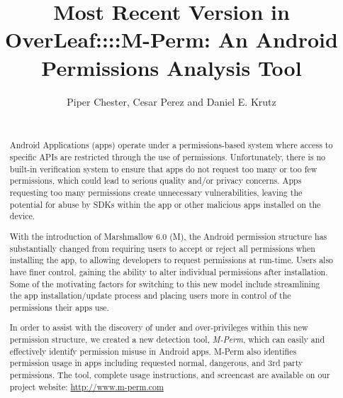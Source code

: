 \documentclass{sig-alternate-05-2015}
\begin{document}
\title{Most Recent Version in OverLeaf::::M-Perm: An Android Permissions Analysis Tool}



\author{
%
\alignauthor
Piper Chester, Cesar Perez and Daniel E. Krutz 	\\
       \\
       \alignauthor
} %



\maketitle
\begin{abstract}
Android Applications (apps) operate under a permissions-based system where access to specific APIs are restricted through the use of permissions. Unfortunately, there is no built-in verification system to ensure that apps do not request too many or too few permissions, which could lead to serious quality and/or privacy concerns. Apps requesting too many permissions create unnecessary vulnerabilities, leaving the potential for abuse by SDKs within the app or other malicious apps installed on the device.

With the introduction of Marshmallow 6.0 (M), the Android permission structure has substantially changed from requiring users to accept or reject all permissions when installing the app, to allowing developers to request permissions at run-time. Users also have finer control, gaining the ability to alter individual permissions after installation. Some of the motivating factors for switching to this new model include streamlining the app installation/update process and placing users more in control of the permissions their apps use.

In order to assist with the discovery of under and over-privileges within this new permission structure, we created a new detection tool, \emph{M-Perm}, which can easily and effectively identify permission misuse in Android apps. M-Perm also identifies permission usage in apps including requested normal, dangerous, and 3rd party permissions. The tool, complete usage instructions, and screencast are available on our project website: \url{http://www.m-perm.com}


\end{abstract}
\end{document}
